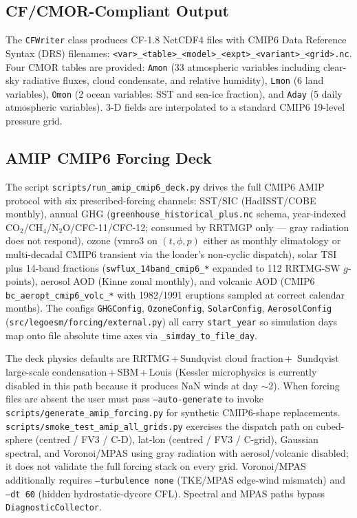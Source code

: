 \documentclass[11pt,a4paper]{article}
\begin{document}
\subsection{CF/CMOR-Compliant Output}

The \texttt{CFWriter} class produces CF-1.8 NetCDF4 files with CMIP6 Data Reference Syntax (DRS) filenames: \texttt{<var>\_<table>\_<model>\_<expt>\_<variant>\_<grid>.nc}.  Four CMOR tables are provided: \texttt{Amon} (33 atmospheric variables including clear-sky radiative fluxes, cloud condensate, and relative humidity), \texttt{Lmon} (6 land variables), \texttt{Omon} (2 ocean variables: SST and sea-ice fraction), and \texttt{Aday} (5 daily atmospheric variables).  3-D fields are interpolated to a standard CMIP6 19-level pressure grid.

\subsection{AMIP CMIP6 Forcing Deck}

The script \texttt{scripts/run\_amip\_cmip6\_deck.py} drives the full
CMIP6 AMIP protocol with six prescribed-forcing channels:
SST/SIC (HadISST/COBE monthly), annual GHG (\texttt{greenhouse\_historical\_plus.nc}
schema, year-indexed CO$_2$/CH$_4$/N$_2$O/CFC-11/CFC-12; consumed by
RRTMGP only --- gray radiation does not respond), ozone
($\mathrm{vmro3}$ on $(t,\phi,p)$ either as monthly climatology or
multi-decadal CMIP6 transient via the loader's non-cyclic dispatch),
solar TSI plus 14-band fractions (\texttt{swflux\_14band\_cmip6\_*}
expanded to 112 RRTMG-SW $g$-points), aerosol AOD (Kinne zonal monthly),
and volcanic AOD (CMIP6 \texttt{bc\_aeropt\_cmip6\_volc\_*} with
1982/1991 eruptions sampled at correct calendar months).  The configs
\texttt{GHGConfig}, \texttt{OzoneConfig}, \texttt{SolarConfig},
\texttt{AerosolConfig} (\texttt{src/legoesm/forcing/external.py})
all carry \texttt{start\_year} so simulation days map onto file
absolute time axes via \texttt{\_simday\_to\_file\_day}.

The deck physics defaults are RRTMG\,+\,Sundqvist cloud fraction\,+\,
Sundqvist large-scale condensation\,+\,SBM\,+\,Louis (Kessler
microphysics is currently disabled in this path because it produces
NaN winds at day ${\sim}2$).  When forcing files are absent the user
must pass \texttt{--auto-generate} to invoke
\texttt{scripts/generate\_amip\_forcing.py} for synthetic
CMIP6-shape replacements.  \texttt{scripts/smoke\_test\_amip\_all\_grids.py}
exercises the dispatch path on cubed-sphere (centred / FV3 / C-D),
lat-lon (centred / FV3 / C-grid), Gaussian spectral, and Voronoi/MPAS
using gray radiation with aerosol/volcanic disabled; it does not
validate the full forcing stack on every grid.  Voronoi/MPAS
additionally requires \texttt{--turbulence none} (TKE/MPAS edge-wind
mismatch) and \texttt{--dt 60} (hidden hydrostatic-dycore CFL).
Spectral and MPAS paths bypass \texttt{DiagnosticCollector}.
\end{document}
